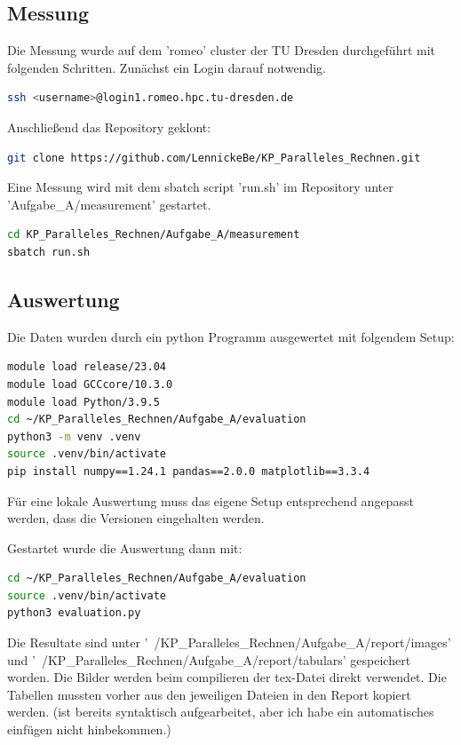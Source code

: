 \documentclass[plainarticle,zihtitle,german,final,hyperref,utf8]{zihpub}
\begin{document}
\subsection{Messung}
Die Messung wurde auf dem 'romeo' cluster der TU Dresden durchgeführt mit folgenden Schritten.
Zunächst ein Login darauf notwendig.

\begin{lstlisting}[language=bash]
ssh <username>@login1.romeo.hpc.tu-dresden.de
\end{lstlisting}

Anschließend das Repository geklont:
\begin{lstlisting}[language=bash]
git clone https://github.com/LennickeBe/KP_Paralleles_Rechnen.git
\end{lstlisting}

Eine Messung wird mit dem sbatch script 'run.sh' im Repository unter 'Aufgabe\_A/measurement' gestartet.

\begin{lstlisting}[language=bash]
cd KP_Paralleles_Rechnen/Aufgabe_A/measurement
sbatch run.sh
\end{lstlisting}

\subsection{Auswertung}
Die Daten wurden durch ein python Programm ausgewertet mit folgendem Setup:
\begin{lstlisting}[language=bash]
module load release/23.04
module load GCCcore/10.3.0
module load Python/3.9.5
cd ~/KP_Paralleles_Rechnen/Aufgabe_A/evaluation
python3 -m venv .venv
source .venv/bin/activate
pip install numpy==1.24.1 pandas==2.0.0 matplotlib==3.3.4
\end{lstlisting}

Für eine lokale Auswertung muss das eigene Setup entsprechend angepasst werden, dass die Versionen eingehalten werden.

Gestartet wurde die Auswertung dann mit:

\begin{lstlisting}[language=bash]
cd ~/KP_Paralleles_Rechnen/Aufgabe_A/evaluation
source .venv/bin/activate
python3 evaluation.py
\end{lstlisting}

Die Resultate sind unter '~/KP\_Paralleles\_Rechnen/Aufgabe\_A/report/images' und  '~/KP\_Paralleles\_Rechnen/Aufgabe\_A/report/tabulars' gespeichert worden.
Die Bilder werden beim compilieren der tex-Datei direkt verwendet. Die Tabellen mussten vorher aus den jeweiligen Dateien in den Report kopiert werden. (ist bereits syntaktisch aufgearbeitet, aber ich habe ein automatisches einfügen nicht hinbekommen.)
\end{document}
